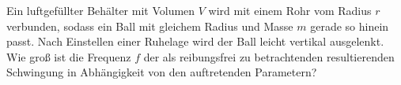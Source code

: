 \begin{Exercise}[label = Luftschwingung, title = Luftschwingung, difficulty = 3, origin = 3. Runde zur 38. IPhO 2007]
Ein luftgefüllter Behälter mit Volumen $V$ wird mit einem Rohr vom Radius $r$ verbunden, sodass ein Ball
mit gleichem Radius und Masse $m$ gerade so hinein passt. Nach
Einstellen einer Ruhelage wird der Ball leicht vertikal ausgelenkt.\\
Wie groß ist die Frequenz $f$ der als reibungsfrei zu betrachtenden
resultierenden Schwingung in Abhängigkeit von den auftretenden
Parametern?
\end{Exercise}

